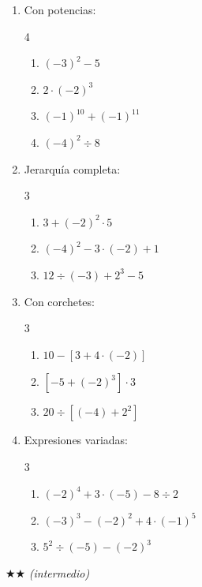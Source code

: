 \documentclass[11pt, letterpaper]{article}
\begin{document}
\begin{enumerate}[label=\textbf{\arabic*.}, leftmargin=*]
  \item Con potencias:
  \begin{multicols}{4}
  \begin{enumerate}[label=\alph*)]
    \item $(-3)^2-5$
    \item $2\cdot(-2)^3$
    \item $(-1)^{10}+(-1)^{11}$
    \item $(-4)^2\div 8$
  \end{enumerate}
  \end{multicols}

  \item Jerarqu\'ia completa:
  \begin{multicols}{3}
  \begin{enumerate}[label=\alph*)]
    \item $3+(-2)^2\cdot 5$
    \item $(-4)^2-3\cdot(-2)+1$
    \item $12\div(-3)+2^3-5$
  \end{enumerate}
  \end{multicols}

  \item Con corchetes:
  \begin{multicols}{3}
  \begin{enumerate}[label=\alph*)]
    \item $10-[3+4\cdot(-2)]$
    \item $[-5+(-2)^3]\cdot 3$
    \item $20\div[(-4)+2^2]$
  \end{enumerate}
  \end{multicols}

  \item Expresiones variadas:
  \begin{multicols}{3}
  \begin{enumerate}[label=\alph*)]
    \item $(-2)^4+3\cdot(-5)-8\div 2$
    \item $(-3)^3-(-2)^2+4\cdot(-1)^5$
    \item $5^2\div(-5)-(-2)^3$
  \end{enumerate}
  \end{multicols}
\end{enumerate}

$\bigstar\bigstar$ \textit{(intermedio)}
\end{document}
